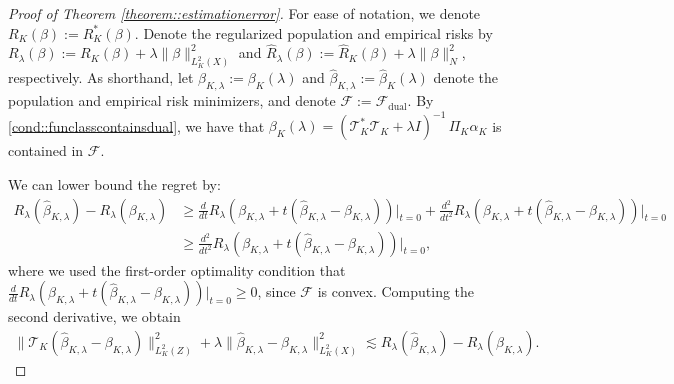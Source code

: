 \documentclass[11pt]{article}
\theoremstyle{plain}
\theoremstyle{definition}
\theoremstyle{remark}
\theoremstyle{definition}
\begin{document}
 \begin{proof}[Proof of Theorem \ref{theorem::estimationerror}]

For ease of notation, we denote $R_K(\beta) :=  R_K^*(\beta)$. Denote the regularized population and empirical risks by $R_{\lambda}(\beta) := R_K(\beta)  + \lambda \|\beta\|^2_{L^2_K(X)}$ and $\widehat{R}_{\lambda}(\beta) := \widehat{R}_{K}(\beta)  + \lambda \|\beta\|^2_{N}$, respectively. As shorthand, let $\beta_{K,\lambda} := \beta_{K}(\lambda) $ and $\widehat{\beta}_{K,\lambda} := \widehat{\beta}_K(\lambda)$ denote the population and empirical risk minimizers, and denote $\mathcal{F} := \mathcal{F}_{\mathrm{dual}}$.  By \ref{cond::funclasscontainsdual}, we have that $\beta_{K}(\lambda) = (\mathcal{T}_{K}^* \mathcal{T}_{K} + \lambda I)^{-1}\,\Pi_{K} \alpha_K$ is contained in $\mathcal{F}$. 


We can lower bound the regret by:
\begin{align*}
   R_{\lambda}(\widehat{\beta}_{K,\lambda}) - R_{\lambda}(\beta_{K,\lambda}) &\geq \frac{d}{dt}  R_{\lambda}(\beta_{K,\lambda} + t(\widehat{\beta}_{K,\lambda}- \beta_{K,\lambda}))\big|_{t=0} + \frac{d^2}{dt^2}  R_{\lambda}(\beta_{K,\lambda} + t(\widehat{\beta}_{K,\lambda}- \beta_{K,\lambda}))\big|_{t=0} \\
    &\geq \frac{d^2}{dt^2}  R_{\lambda}(\beta_{K,\lambda} + t(\widehat{\beta}_{K,\lambda}- \beta_{K,\lambda}))\big|_{t=0},
\end{align*}
where we used the first-order optimality condition that $ \frac{d}{dt}  R_{\lambda}(\beta_{K,\lambda} + t(\widehat{\beta}_{K,\lambda}- \beta_{K,\lambda}))\big|_{t=0} \geq 0 $, since $\mathcal{F}$ is convex. Computing the second derivative, we obtain
 \begin{align}
\|\mathcal{T}_{K}(\widehat{\beta}_{K,\lambda}- \beta_{K,\lambda})\|_{L^2_K(Z)}^2 + \lambda \| \widehat{\beta}_{K,\lambda}- \beta_{K,\lambda}\|_{L^2_K(X)}^2 \lesssim   R_{\lambda}(\widehat{\beta}_{K,\lambda}) - R_{\lambda}(\beta_{K,\lambda}).  \label{eqn::lowerriskbound}
\end{align}


 




\end{proof}
\end{document}
